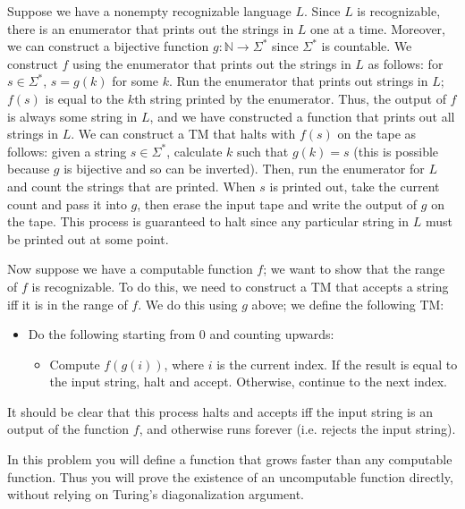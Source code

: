 \documentclass[solution, letterpaper]{cs121}
\begin{document}
\begin{solution}
Suppose we have a nonempty recognizable language $L$.  Since $L$ is recognizable, there is an enumerator that prints out the strings in $L$ one at a time.  Moreover, we can construct a bijective function $g: \mathbb{N} \rightarrow \Sigma^*$ since $\Sigma^*$ is countable.  We construct $f$ using the enumerator that prints out the strings in $L$ as follows: for $s \in \Sigma^*$, $s = g(k)$ for some $k$.  Run the enumerator that prints out strings in $L$; $f(s)$ is equal to the $k$th string printed by the enumerator.  Thus, the output of $f$ is always some string in $L$, and we have constructed a function that prints out all strings in $L$.  We can construct a TM that halts with $f(s)$ on the tape as follows: given a string $s \in \Sigma^*$, calculate $k$ such that $g(k) = s$ (this is possible because $g$ is bijective and so can be inverted).  Then, run the enumerator for $L$ and count the strings that are printed.  When $s$ is printed out, take the current count and pass it into $g$, then erase the input tape and write the output of $g$ on the tape.  This process is guaranteed to halt since any particular string in $L$ must be printed out at some point.

Now suppose we have a computable function $f$; we want to show that the range of $f$ is recognizable.  To do this, we need to construct a TM that accepts a string iff it is in the range of $f$.  We do this using $g$ above; we define the following TM: 
\begin{itemize}
	\setlength\itemsep{0cm}
	\item Do the following starting from 0 and counting upwards:
	\begin{itemize}
		\item Compute $f(g(i))$, where $i$ is the current index.  If the result is equal to the input string, halt and accept.  Otherwise, continue to the next index.
	\end{itemize}
\end{itemize}

It should be clear that this process halts and accepts iff the input string is an output of the function $f$, and otherwise runs forever (i.e. rejects the input string).
\end{solution}

In this problem you will define a function that grows faster than any computable function. Thus you will prove the existence of an uncomputable function directly, without relying on Turing's diagonalization argument. 
\end{document}
